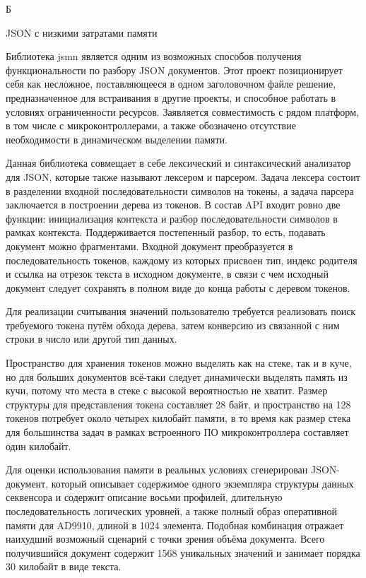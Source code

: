 \documentclass{report}
\begin{document}
\pagebreak
\begin{flushright}
     Б
\end{flushright}

\begin{center}   JSON с низкими затратами памяти \end{center}

Библиотека jsmn является одним из возможных способов получения функциональности по разбору JSON документов. Этот проект позиционирует себя как несложное, поставляющееся в одном заголовочном файле решение, предназначенное для встраивания в другие проекты, и способное работать в условиях ограниченности ресурсов. Заявляется совместимость с рядом платформ, в том числе с микроконтроллерами, а также обозначено отсутствие необходимости в динамическом выделении памяти.

Данная библиотека совмещает в себе лексический и синтаксический анализатор для JSON, которые также называют лексером и парсером. Задача лексера состоит в разделении входной последовательности символов на токены, а задача парсера заключается в построении дерева из токенов. В состав API входит ровно две функции: инициализация контекста и разбор последовательности символов в рамках контекста. Поддерживается постепенный разбор, то есть, подавать документ можно фрагментами. Входной документ преобразуется в последовательность токенов, каждому из которых присвоен тип, индекс родителя и ссылка на отрезок текста в исходном документе, в связи с чем исходный документ следует сохранять в полном виде до конца работы с деревом токенов.

Для реализации считывания значений пользователю требуется реализовать поиск требуемого токена путём обхода дерева, затем конверсию из связанной с ним строки в число или другой тип данных.

Пространство для хранения токенов можно выделять как на стеке, так и в куче, но для больших документов всё-таки следует динамически выделять память из кучи, потому что места в стеке с высокой вероятностью не хватит. Размер структуры для представления токена составляет 28 байт, и пространство на 128 токенов потребует около четырех килобайт памяти, в то время как размер стека для большинства задач в рамках встроенного ПО микроконтроллера составляет один килобайт.

Для оценки использования памяти в реальных условиях сгенерирован JSON-документ, который описывает содержимое одного экземпляра структуры данных секвенсора и содержит описание восьми профилей, длительную последовательность логических уровней, а также полный образ оперативной памяти для AD9910, длиной в 1024 элемента. Подобная комбинация отражает наихудший возможный сценарий с точки зрения объёма документа. Всего получившийся документ содержит 1568 уникальных значений и занимает порядка 30 килобайт в виде текста.
\end{document}
